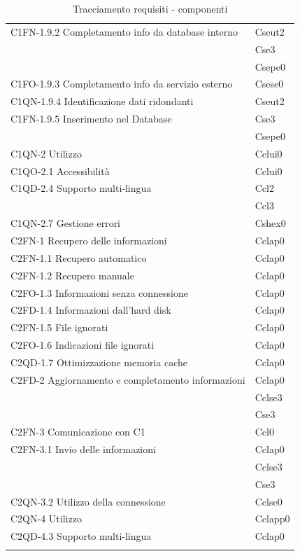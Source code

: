 \begin{footnotesize}
\begin{longtable}[!h]{|l|l|}
C1FN-1.9.2 Completamento info da database interno & Cseut2\\
 & Cse3\\
 & Csepe0\\\hline
C1FO-1.9.3 Completamento info da servizio esterno & Csese0\\ \hline
C1QN-1.9.4 Identificazione dati ridondanti & Cseut2\\ \hline
C1FN-1.9.5 Inserimento nel Database & Cse3\\
 & Csepe0\\\hline
C1QN-2 Utilizzo & Cclui0\\ \hline
C1QO-2.1 Accessibilit\`a &Cclui0\\ \hline
C1QD-2.4 Supporto multi-lingua & Ccl2\\
 & Ccl3\\\hline
C1QN-2.7 Gestione errori & Cshex0\\ \hline
C2FN-1 Recupero delle informazioni & Cclap0\\\hline
C2FN-1.1 Recupero automatico & Cclap0\\\hline
C2FN-1.2 Recupero manuale & Cclap0\\\hline
C2FO-1.3 Informazioni senza connessione & Cclap0\\ \hline
C2FD-1.4 Informazioni dall'hard disk & Cclap0\\\hline
C2FN-1.5 File ignorati & Cclap0\\\hline
C2FO-1.6 Indicazioni file ignorati & Cclap0\\ \hline
C2QD-1.7 Ottimizzazione memoria cache & Cclap0\\ \hline 
C2FD-2 Aggiornamento e completamento informazioni & Cclap0\\
 & Cclse3\\
 & Cse3\\\hline 
C2FN-3 Comunicazione con C1 & Ccl0\\ \hline 
C2FN-3.1 Invio delle informazioni & Cclap0\\
 & Cclse3\\
 & Cse3\\\hline 
C2QN-3.2 Utilizzo della connessione & Cclse0\\ \hline 
C2QN-4 Utilizzo & Cclapp0\\\hline
C2QD-4.3 Supporto multi-lingua & Cclap0\\ \hline
\caption{Tracciamento requisiti - componenti}
\end{longtable}
\end{footnotesize}

